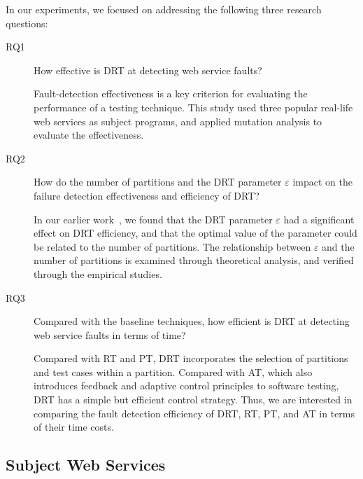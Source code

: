 \documentclass[10pt,journal,compsoc]{IEEEtran}
\begin{document}
In our experiments, we focused on addressing the following three research questions:

\begin{description}
  \item [RQ1] How effective is DRT at detecting web service faults?

  Fault-detection effectiveness is a key criterion for evaluating the performance of a testing technique.
  This study used three popular real-life web services as subject programs, and applied mutation analysis to evaluate the effectiveness.

  \item [RQ2] How do the number of partitions and the DRT parameter $\varepsilon$ impact on the failure detection effectiveness and efficiency of DRT?

  In our earlier work~\cite{sun2012towards}, we found that the DRT parameter $\varepsilon$ had a significant effect on DRT efficiency, and  that the optimal value of the parameter could be related to the number of partitions.
  The relationship between $\varepsilon$ and the number of partitions is examined through theoretical analysis, and verified through the empirical studies.

  \item [RQ3]

  Compared with the baseline techniques, how efficient is DRT at detecting web service faults in terms of time?

  Compared with RT and PT, DRT incorporates the selection of partitions and test cases within a partition. Compared with AT, which also introduces feedback and adaptive control principles to software testing, DRT has a simple but efficient control strategy. Thus, we are interested in comparing the fault detection efficiency of DRT, RT, PT, and AT in terms of their time costs.



\end{description}

\subsection{Subject Web Services}
\label{sec:subjects}
\end{document}
